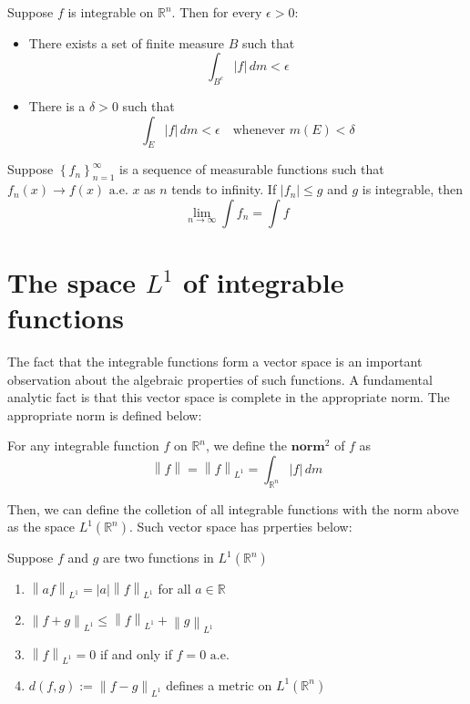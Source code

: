 \documentclass{ctexbook}
\begin{document}
\begin{thm}
    Suppose $f$ is integrable on $\mathbb{R}^n$. Then for every $\epsilon > 0$:
    \begin{itemize}
        \item There exists a set of finite measure $B$ such that \[\int_{B^c} \left\lvert f\right\rvert \, dm < \epsilon\]
        \item There is a $\delta > 0$ such that \[\int_E \left\lvert f\right\rvert\,dm < \epsilon\quad\text{whenever }m(E) < \delta \]
    \end{itemize}
\end{thm}

\begin{thm}
    Suppose $\left\{f_n\right\}_{n=1}^\infty$ is a sequence of measurable functions such that $f_n(x)\rightarrow f(x)\text{ a.e. }x$
    as $n$ tends to infinity. If $\left\lvert f_n\right\rvert \leq g $ and $g$ is integrable, then
    \[\lim_{n\rightarrow\infty}\int f_n = \int f\]
\end{thm}

\section{The space \texorpdfstring{$L^1$}. of integrable functions}

The fact that the integrable functions form a vector space is an important observation about the algebraic properties of such
functions. A fundamental analytic fact is that this vector space is complete in the appropriate norm. The appropriate norm is
defined below:
\begin{define}
    For any integrable function $f$ on $\mathbb{R}^n$, we define the $\textbf{norm}^2$ of $f$ as
    \[\left\lVert f\right\rVert = \left\lVert f\right\rVert _{L^1} = \int_{\mathbb{R}^n} \left\lvert f\right\rvert\, dm\]
\end{define}

Then, we can define the colletion of all integrable functions with the norm above as the space $L^1(\mathbb{R}^n)$. Such vector
space has prperties below:
\begin{prop}
    Suppose $f$ and $g$ are two functions in $L^1(\mathbb{R}^n)$
    \begin{enumerate}
        \item $\left\lVert af\right\rVert _{L^1} = \left\lvert a\right\rvert \left\lVert f\right\rVert _{L^1} $ for all $a \in \mathbb{R}$
        \item $\left\lVert f+g\right\rVert _{L^1} \leq \left\lVert f\right\rVert _{L^1} + \left\lVert g\right\rVert _{L^1} $
        \item $\left\lVert f\right\rVert _{L^1} = 0$ if and only if $f = 0\text{ a.e. }$
        \item $d(f,g):=\left\lVert f-g\right\rVert _{L^1}$ defines a metric on $L^1(\mathbb{R}^n)$
    \end{enumerate}
\end{prop}
\end{document}
